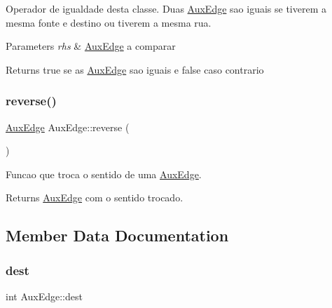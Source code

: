 Operador de igualdade desta classe. Duas \hyperlink{class_aux_edge}{Aux\+Edge} sao iguais se tiverem a mesma fonte e destino ou tiverem a mesma rua.


\begin{DoxyParams}{Parameters}
{\em rhs} & \hyperlink{class_aux_edge}{Aux\+Edge} a comparar \\
\hline
\end{DoxyParams}
\begin{DoxyReturn}{Returns}
true se as \hyperlink{class_aux_edge}{Aux\+Edge} sao iguais e false caso contrario 
\end{DoxyReturn}
\mbox{\label{class_aux_edge_a6561f80676278a04d73640c2166c438f}} 
\subsubsection{\texorpdfstring{reverse()}{reverse()}}
{\footnotesize\ttfamily \hyperlink{class_aux_edge}{Aux\+Edge} Aux\+Edge\+::reverse (\begin{DoxyParamCaption}{ }\end{DoxyParamCaption})\hspace{0.3cm}{\ttfamily [inline]}}

Funcao que troca o sentido de uma \hyperlink{class_aux_edge}{Aux\+Edge}.

\begin{DoxyReturn}{Returns}
\hyperlink{class_aux_edge}{Aux\+Edge} com o sentido trocado. 
\end{DoxyReturn}


\subsection{Member Data Documentation}
\mbox{\label{class_aux_edge_acee560d785382eeb7ed695c59903bbe9}} 
\subsubsection{\texorpdfstring{dest}{dest}}
{\footnotesize\ttfamily int Aux\+Edge\+::dest}

\mbox{\label{class_aux_edge_aa9a8ff092babb6f3e3df271b400cdf17}} 
